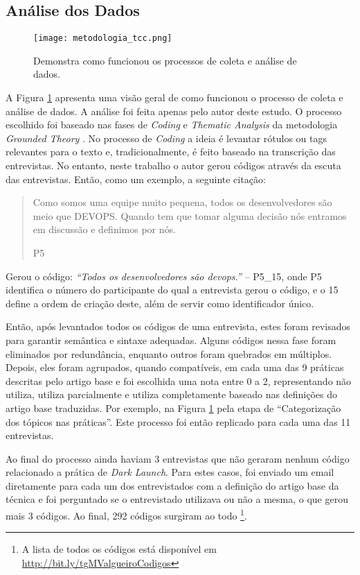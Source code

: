 \subsection{Análise dos Dados}

\begin{figure}[ht]
\begin{center}
\texttt{[image: metodologia\_tcc.png]}
\end{center}
\caption[Fluxograma da Metodologia]{
    Demonstra como funcionou os processos de coleta e análise de dados.
}\label{fluxograma_metodologia}
\end{figure}

    
A Figura \ref{fluxograma_metodologia} apresenta uma visão geral de como funcionou o processo de coleta e análise de dados. A análise foi feita apenas pelo autor deste estudo. O processo escolhido foi baseado nas fases de \emph{Coding} e \emph{Thematic Analysis} da metodologia \emph{Grounded Theory} \cite{groundedTheory}. No processo de \emph{Coding} a ideia é levantar rótulos ou tags relevantes para o texto e, tradicionalmente, é feito baseado na transcrição das entrevistas. No entanto, neste trabalho o autor gerou códigos através da escuta das entrevistas. Então, como um exemplo, a seguinte citação:

\blockquote[P5]{Como somos uma equipe muito pequena, todos os desenvolvedores são meio que DEVOPS. Quando tem que tomar alguma decisão nós entramos em discussão e definimos por nós.}

Gerou o código: \emph{``Todos os desenvolvedores são devops.''} -- P5\_15, onde P5 identifica o número do participante do qual a entrevista gerou o código, e o 15 define a ordem de criação deste, além de servir como identificador único.

Então, após levantados todos os códigos de uma entrevista, estes foram revisados para garantir semântica e sintaxe adequadas. Alguns códigos nessa fase foram eliminados por redundância, enquanto outros foram quebrados em múltiplos. Depois, eles foram agrupados, quando compatíveis, em cada uma das 9 práticas descritas pelo artigo base e foi escolhida uma nota entre 0 a 2, representando não utiliza, utiliza parcialmente e utiliza completamente baseado nas definições do artigo base traduzidas. Por exemplo, na Figura \ref{fluxograma_metodologia} pela etapa de ``Categorização dos tópicos nas práticas''. Este processo foi então replicado para cada uma das 11 entrevistas.

Ao final do processo ainda haviam 3 entrevistas que não geraram nenhum código relacionado a prática de \emph{Dark Launch}. Para estes casos, foi enviado um email diretamente para cada um dos entrevistados com a definição do artigo base da técnica e foi perguntado se o entrevistado utilizava ou não a mesma, o que gerou mais 3 códigos. Ao final, 292 códigos surgiram ao todo \footnote{A lista de todos os códigos está disponível em \url{http://bit.ly/tgMValgueiroCodigos}}.


